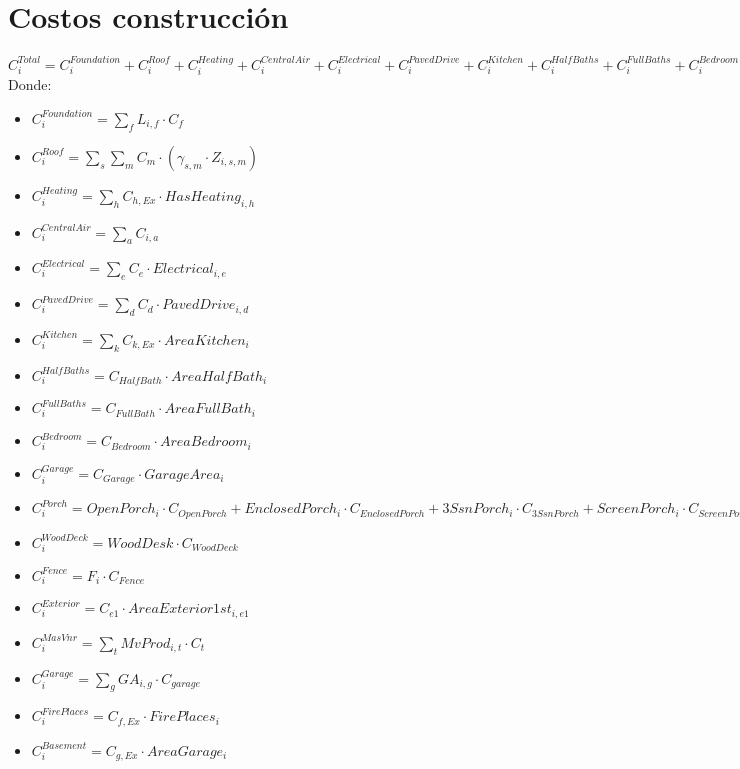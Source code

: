 \section{Costos construcción}
$C_{i}^{Total}=C_{i}^{Foundation}+C_i^{Roof}+C_{i}^{Heating}+C_{i}^{CentralAir}+C_{i}^{Electrical}+C_{i}^{PavedDrive}+C_{i}^{Kitchen}+C_{i}^{HalfBaths}+C_{i}^{FullBaths}+C_{i}^{Bedroom}+C_{i}^{Garage}+C_{i}^{Porch}+C_{i}^{WoodDeck}+C_{i}^{Reja} + C{i}^{Basement}+C_{i}^{MasVnr}+C_{i}^{Exterior}+C_{i}^{MiscFeature} +C_{i}^{FirePlaces}$\\
Donde:
\begin{itemize}
    \item $C_{i}^{Foundation}=\sum _{f} L_{i,f}\cdot C_{f}$
    \item $C_i^{Roof}= \sum_{s} \sum_{m} C_{m}\cdot (\gamma_{s,m}\cdot Z_{i,s,m})$
    \item $C_{i}^{Heating}=\sum_{h} C_{h,Ex}\cdot HasHeating_{i,h}$
    \item $C_{i}^{CentralAir}= \sum_{a} C_{i,a}$
    \item $C_{i}^{Electrical}=\sum_{e} C_{e} \cdot Electrical_{i,e}$
    \item $C_{i}^{PavedDrive}= \sum_{d} C_{d}\cdot PavedDrive_{i,d}$
    \item $C_{i}^{Kitchen}=\sum_{k}C_{k,Ex}\cdot AreaKitchen_{i}$
    \item $C_{i}^{HalfBaths}= C_{HalfBath}\cdot AreaHalfBath_{i}$
    \item $C_{i}^{FullBaths}= C_{FullBath}\cdot AreaFullBath_{i}$
    \item $C_{i}^{Bedroom}= C_{Bedroom}\cdot AreaBedroom_{i}$
    \item $C_{i}^{Garage}=C_{Garage}\cdot GarageArea_{i}$
    \item $C_{i}^{Porch}= OpenPorch_{i}\cdot C_{OpenPorch}+EnclosedPorch_{i}\cdot C_{EnclosedPorch}+3SsnPorch_{i}\cdot C_{3SsnPorch}+ScreenPorch_{i} \cdot C_{ScreenPorch}$
    \item $C_{i}^{WoodDeck}=WoodDesk\cdot C_{WoodDeck}$
    \item $C_{i}^{Fence}=F_{i}\cdot C_{Fence}$
    \item $C_{i}^{Exterior}=C_{e1} \cdot AreaExterior1st_{i,e1}$
    \item $C_i^{MasVnr}=\sum _{t}MvProd_{i,t}\cdot C_{t}$
    \item $C_{i}^{Garage}= \sum_{g} GA_{i,g}\cdot C_{garage}$
    \item $C_{i}^{FirePlaces}=C_{f,Ex}\cdot FirePlaces_{i}$
    \item $C_{i}^{Basement}= C_{g,Ex}\cdot AreaGarage_{i}$
\end{itemize}
